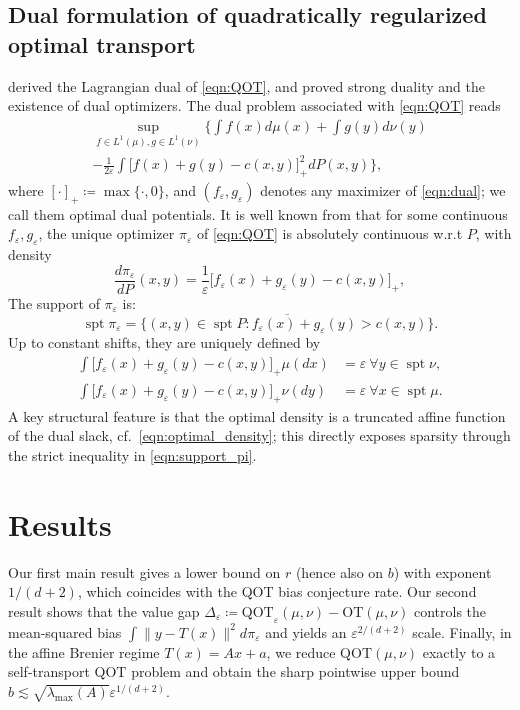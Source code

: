 \documentclass{article}
\theoremstyle{plain}
\theoremstyle{definition}
\theoremstyle{remark}
\numberwithin{equation}{section}
\DeclareMathOperator{\spt}{spt}
\newcommand{\OT}{\mathrm{OT}}
\newcommand{\QOT}{\mathrm{QOT}}
\begin{document}
\subsection{Dual formulation of quadratically regularized optimal transport}\label{sec:QOT}
\citet{seguy2018large} derived the Lagrangian dual of \eqref{eqn:QOT}, and \citet{lorenz2021quadratically} proved strong duality and the existence of dual optimizers.
The dual problem associated with \eqref{eqn:QOT} reads
\begin{multline}\label{eqn:dual}
\sup_{f\in L^1(\mu),g\in L^1(\nu)}\Big\{\int f(x)d\mu(x)+\int g(y)d\nu(y)\\
-\frac{1}{2\varepsilon}\int\bigl[f(x)+g(y)-c(x,y)\bigr]_+^2dP(x,y)\Big\}, 
\end{multline}
where $[\cdot]_+\coloneqq\max\{\cdot,0\}$, and $(f_\varepsilon,g_\varepsilon)$ denotes any maximizer of \eqref{eqn:dual}; we call them optimal dual potentials.
It is well known from \citet{lorenz2021quadratically} that for some continuous $f_\varepsilon,g_\varepsilon$, the unique optimizer $\pi_\varepsilon$ of \eqref{eqn:QOT} is absolutely continuous w.r.t $P$, with density
\begin{equation}\label{eqn:optimal_density}
\frac{d\pi_\varepsilon}{dP}(x,y)=\frac{1}{\varepsilon}\bigl[f_\varepsilon(x)+g_\varepsilon(y)-c(x,y)\bigr]_+,
\end{equation}
The support of $\pi_\varepsilon$ is:
\begin{equation}\label{eqn:support_pi}
\spt\pi_\varepsilon=\overline{\bigl\{(x,y)\in\spt P:f_\varepsilon(x)+g_\varepsilon(y)>c(x,y)\bigr\}}.
\end{equation}
Up to constant shifts, they are uniquely defined by
\begin{align}
\int\bigl[f_\varepsilon(x)+g_\varepsilon(y)-c(x,y)\bigr]_+\mu(dx)&=\varepsilon\ \forall y\in\spt\nu,\label{eqn:dual1}\\
\int\bigl[f_\varepsilon(x)+g_\varepsilon(y)-c(x,y)\bigr]_+\nu(dy)&=\varepsilon\ \forall x\in\spt\mu.\label{eqn:dual2}
\end{align}
A key structural feature is that the optimal density is a truncated affine function of the dual slack, cf.\ \eqref{eqn:optimal_density}; this directly exposes sparsity through the strict inequality in \eqref{eqn:support_pi}.

\section{Results}\label{sec:results}
Our first main result gives a lower bound on $r$ (hence also on $b$) with exponent $1/(d+2)$, which coincides with the QOT bias conjecture rate.
Our second result shows that the value gap $\Delta_\varepsilon\coloneqq\QOT_\varepsilon(\mu,\nu)-\OT(\mu,\nu)$ controls the mean-squared bias $\int\|y-T(x)\|^2d\pi_\varepsilon$ and yields an $\varepsilon^{2/(d+2)}$ scale.
Finally, in the affine Brenier regime $T(x)=Ax+a$, we reduce QOT$(\mu,\nu)$ exactly to a self-transport QOT problem and obtain the sharp pointwise upper bound $b\lesssim\sqrt{\lambda_{\max}(A)}\varepsilon^{1/(d+2)}$.
\end{document}

